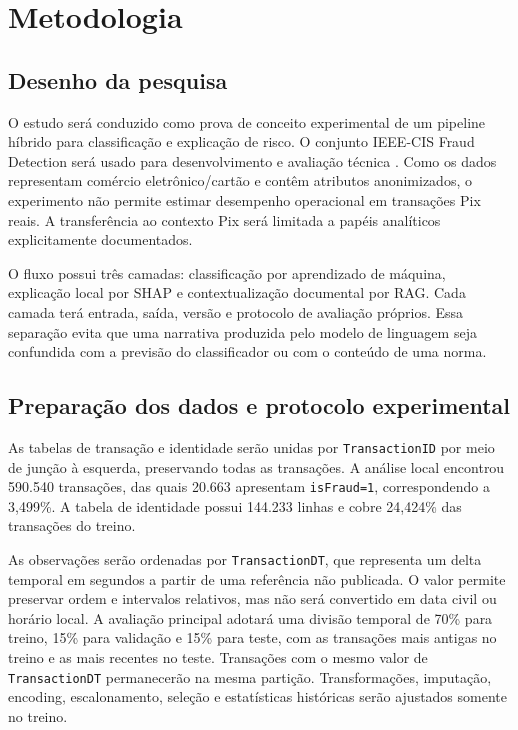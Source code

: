 \chapter{Metodologia}

\section{Desenho da pesquisa}

O estudo será conduzido como prova de conceito experimental de um pipeline híbrido para classificação e explicação de risco. O conjunto IEEE-CIS Fraud Detection será usado para desenvolvimento e avaliação técnica \cite{ieee_cis_2019}. Como os dados representam comércio eletrônico/cartão e contêm atributos anonimizados, o experimento não permite estimar desempenho operacional em transações Pix reais. A transferência ao contexto Pix será limitada a papéis analíticos explicitamente documentados.

O fluxo possui três camadas: classificação por aprendizado de máquina, explicação local por SHAP e contextualização documental por RAG. Cada camada terá entrada, saída, versão e protocolo de avaliação próprios. Essa separação evita que uma narrativa produzida pelo modelo de linguagem seja confundida com a previsão do classificador ou com o conteúdo de uma norma.

\section{Preparação dos dados e protocolo experimental}

As tabelas de transação e identidade serão unidas por \texttt{TransactionID} por meio de junção à esquerda, preservando todas as transações. A análise local encontrou 590.540 transações, das quais 20.663 apresentam \texttt{isFraud=1}, correspondendo a 3,499\%. A tabela de identidade possui 144.233 linhas e cobre 24,424\% das transações do treino.

As observações serão ordenadas por \texttt{TransactionDT}, que representa um delta temporal em segundos a partir de uma referência não publicada. O valor permite preservar ordem e intervalos relativos, mas não será convertido em data civil ou horário local. A avaliação principal adotará uma divisão temporal de 70\% para treino, 15\% para validação e 15\% para teste, com as transações mais antigas no treino e as mais recentes no teste. Transações com o mesmo valor de \texttt{TransactionDT} permanecerão na mesma partição. Transformações, imputação, encoding, escalonamento, seleção e estatísticas históricas serão ajustados somente no treino.

